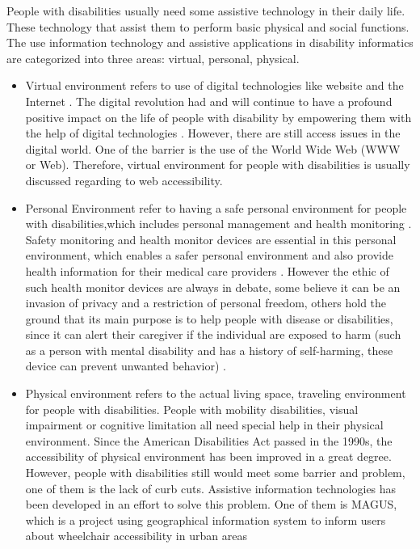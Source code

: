 People with disabilities usually need some 
assistive technology in their daily life. These technology that assist them to perform basic physical and 
social functions. The use information technology and assistive applications in disability informatics are 
categorized into three areas: virtual, personal, physical. 
\begin{itemize}
  \item Virtual environment refers to use of digital technologies like website 
  and the Internet \cite{Appleyard2005}. The digital revolution had and will 
  continue to have a profound positive impact on the life of people with disability 
  by empowering them with the help of digital technologies \cite{Appleyard2005}. 
  However, there are still access issues in the digital world. One of the barrier 
  is the use of the World Wide Web (WWW or Web). Therefore, virtual environment 
  for people with disabilities is usually discussed regarding to web accessibility. 
  \item Personal Environment refer to having a safe personal environment for people 
  with disabilities,which includes personal management and health monitoring \cite{Appleyard2005}. 
  Safety monitoring and health monitor devices are essential in this personal environment,
  which enables a safer personal environment and also provide health information for 
  their medical care providers \cite{Appleyard2005}. However the ethic of such health 
  monitor devices are always in debate, some believe it can be an invasion of privacy 
  and a restriction of personal freedom, others hold the ground that its main purpose is 
  to help people with disease or disabilities, since it can alert their caregiver if the 
  individual are exposed to harm (such as a person with mental disability and has a 
  history of self-harming, these device can prevent unwanted behavior) \cite{cunningham2017cloud}. 
  \item Physical environment refers to the actual living space, traveling environment for people with 
  disabilities. People with mobility disabilities, visual impairment or cognitive limitation all need 
  special help in their physical environment. Since the American Disabilities Act passed in the 
  1990s, the accessibility of physical environment has been improved in a great degree. 
  However, people with disabilities still would meet some barrier and problem, one of them is 
  the lack of curb cuts. Assistive information technologies has been developed in an effort to solve 
  this problem. One of them is MAGUS, which is a project using geographical information system to 
  inform users about wheelchair accessibility in urban areas \cite{Appleyard2005}
\end{itemize}





